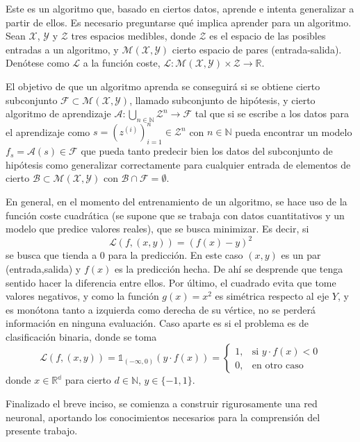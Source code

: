 Este es un algoritmo que, basado en ciertos datos, aprende e intenta generalizar a partir de ellos. Es necesario preguntarse qué implica aprender para un algoritmo. Sean $\mathcal{X}$, $\mathcal{Y}$ y $\mathcal{Z}$ tres espacios medibles, donde $\mathcal{Z}$ es el espacio de las posibles entradas a un algoritmo, y $\mathcal{M(X,Y)}$ cierto espacio de pares (entrada-salida). Denótese como $\mathcal{L}$ a la función coste, $\mathcal{L}: \mathcal{M(X,Y)} \times \mathcal{Z} \to \mathbb{R}$. 

El objetivo de que un algoritmo aprenda se conseguirá si se obtiene cierto subconjunto $\mathcal{F} \subset \mathcal{M(X,Y)}$, llamado subconjunto de hipótesis, y cierto algoritmo de aprendizaje $\mathcal{A}: \bigcup_{n \in \mathbb{N}} \mathcal{Z}^n
 \to \mathcal{F}$ tal que si se escribe a los datos para el aprendizaje como $s = (z^{(i)})_{i=1}^{n} \in \mathcal{Z}^n$ con $n \in \mathbb{N}$ pueda encontrar un modelo $f_s = \mathcal{A}(s) \in \mathcal{F}$ que pueda tanto predecir bien los datos del subconjunto de hipótesis como generalizar correctamente para cualquier entrada de elementos de cierto $\mathcal{B} \subset \mathcal{M(X,Y)}$ con $\mathcal{B} \cap \mathcal{F} = \emptyset$.
 
En general, en el momento del entrenamiento de un algoritmo, se hace uso de la función coste cuadrática (se supone que se trabaja con datos cuantitativos y un modelo que predice valores reales), que se busca minimizar. Es decir, si $$\mathcal{L}(f,(x,y)) = (f(x)-y)^2$$  se busca que tienda a 0 para la predicción. En este caso $(x,y)$ es un par (entrada,salida) y $f(x)$ es la predicción hecha. De ahí se desprende que tenga sentido hacer la diferencia entre ellos. Por último, el cuadrado evita que tome valores negativos, y como la función $g(x)=x^2$ es simétrica respecto al eje $Y$, y es monótona tanto a izquierda como derecha de su vértice, no se perderá información en ninguna evaluación.
Caso aparte es si el problema es de clasificación binaria, donde se toma $$\mathcal{L}(f,(x,y)) = \mathbb{1}_{(-\infty,0)}(y \cdot f(x)) = \begin{cases}
    1, & \text{si } y \cdot f(x) < 0 \\
    0, & \text{en otro caso}
\end{cases}
$$ donde $x \in \mathbb{R^d}$ para cierto $d \in \mathbb{N}$, $y \in \{-1,1\}$.

Finalizado el breve inciso, se comienza a construir rigurosamente una red neuronal, aportando los conocimientos necesarios para la comprensión del presente trabajo.


